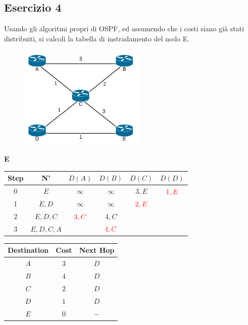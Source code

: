 \documentclass[10pt]{article}
\begin{document}
		\subsection{Esercizio 4}
			Usando gli algoritmi propri di OSPF, ed assumendo che i costi siano già stati distribuiti, si calcoli la tabella di instradamento del nodo E.
			\begin{figure}[h]
				\centering
				\includegraphics[width=6cm]{es5}
			\end{figure}
			\begin{center}
				\textbf{E}
				\begin{tabular}{||c c c c c c||} 
					\hline
					Step & N' & $D(A)$ & $D(B)$ & $D(C)$ & $D(D)$ \\[0.5ex] 
					\hline\hline
					0 & $E$ & $\infty$ & $\infty$ & $3,E$ & $\color{red} 1,E$ \\
					\hline
					1 & $E,D$ & $\infty$ & $\infty$ & $\color{red} 2,E$ & \\
					\hline
					2 & $E,D,C$ & $\color{red} 3,C$ & $4,C$ &  & \\
					\hline
					3 & $E,D,C,A$ & & $\color{red} 4,C$ & & \\[0.5ex] 
					\hline
				\end{tabular} 
				\quad
				\begin{tabular}{||c || c || c||}
					\hline
					Destination & Cost & Next Hop \\[0.5ex] 
					\hline\hline
					$A$ & $3$ & $D$ \\
					$B$ & $4$ & $D$ \\
					$C$ & $2$ & $D$ \\
					$D$ & $1$ & $D$ \\
					$E$ & $0$ & $-$ \\[0.5ex] 
					\hline
				\end{tabular}
			\end{center}

		\newpage
\end{document}
